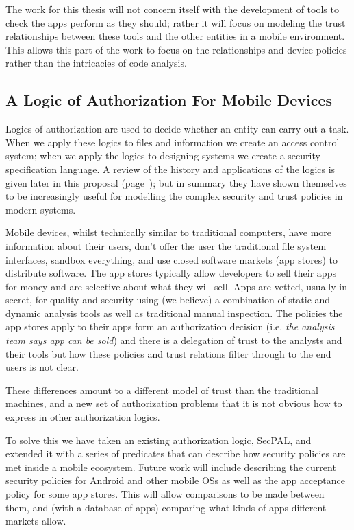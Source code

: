 \documentclass[a4paper,sfsidenotes]{tufte-book}
\begin{document}
The work for this thesis will not concern itself with the development of tools
to check the apps perform as they should; rather it will focus on modeling the
trust relationships between these tools and the other entities in a mobile
environment.  This allows this part of the work to focus on the relationships
and device policies rather than the intricacies of code analysis.


\subsection{A Logic of Authorization For Mobile Devices}

Logics of authorization are used to decide whether an entity can carry out a
task.  When we apply these logics to files and information we create an access
control system; when we apply the logics to designing systems we create a
security specification language.  A review of the history and applications of
the logics is given later in this proposal (page~\pageref{sec:pollang}); but in
summary they have shown themselves to be increasingly useful for modelling the
complex security and trust policies in modern systems.

Mobile devices, whilst technically similar to traditional computers, have more
information about their users, don't offer the user the traditional file system
interfaces, sandbox everything, and use closed software markets (app stores) to
distribute software.  The app stores typically allow developers to sell their
apps for money and are selective about what they will sell.  Apps are vetted,
usually in secret, for quality and security using (we believe) a combination of
static and dynamic analysis tools as well as traditional manual inspection.
The policies the app stores apply to their apps form an authorization decision
(i{.}e{.} \emph{the analysis team says app can be sold}) and there is a
delegation of trust to the analysts and their tools but how these policies and
trust relations filter through to the end users is not clear.

These differences amount to a different model of trust
than the traditional machines, and a new set of authorization problems that it
is not obvious how to express in other authorization logics. 

To solve this we have taken an existing authorization logic,
SecPAL\cite{Becker:2006vh}, and extended it with a series of predicates that can
describe how security policies are met inside a mobile ecosystem.  Future work
will include describing the current security policies for Android and other
mobile OSs as well as the app acceptance policy for some app stores.  This will allow comparisons to be
made between them, and (with a database of apps) comparing what kinds of apps
different markets allow.
\end{document}
